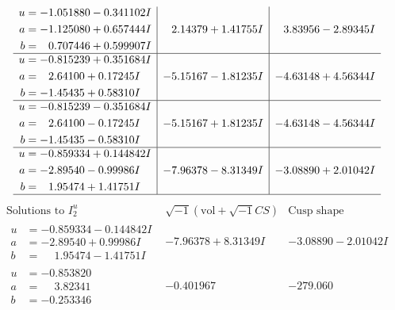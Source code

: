 \documentclass[1p]{elsarticle_modified}
\theoremstyle{definition}
\newcommand{\I}{\sqrt{-1}}
\begin{document}
$$\begin{array}{c|c|c}
\begin{aligned}
u &= -1.051880 - 0.341102 I \\
a &= -1.125080 + 0.657444 I \\
b &= \phantom{-}0.707446 + 0.599907 I\end{aligned}
 & \phantom{-}2.14379 + 1.41755 I & \phantom{-}3.83956 - 2.89345 I \\ \hline\begin{aligned}
u &= -0.815239 + 0.351684 I \\
a &= \phantom{-}2.64100 + 0.17245 I \\
b &= -1.45435 + 0.58310 I\end{aligned}
 & -5.15167 - 1.81235 I & -4.63148 + 4.56344 I \\ \hline\begin{aligned}
u &= -0.815239 - 0.351684 I \\
a &= \phantom{-}2.64100 - 0.17245 I \\
b &= -1.45435 - 0.58310 I\end{aligned}
 & -5.15167 + 1.81235 I & -4.63148 - 4.56344 I \\ \hline\begin{aligned}
u &= -0.859334 + 0.144842 I \\
a &= -2.89540 - 0.99986 I \\
b &= \phantom{-}1.95474 + 1.41751 I\end{aligned}
 & -7.96378 - 8.31349 I & -3.08890 + 2.01042 I\\
 \hline 
 \end{array}$$\newpage$$\begin{array}{c|c|c}  
\text{Solutions to }I^u_{2}& \I (\text{vol} + \sqrt{-1}CS) & \text{Cusp shape}\\
 \hline 
\begin{aligned}
u &= -0.859334 - 0.144842 I \\
a &= -2.89540 + 0.99986 I \\
b &= \phantom{-}1.95474 - 1.41751 I\end{aligned}
 & -7.96378 + 8.31349 I & -3.08890 - 2.01042 I \\ \hline\begin{aligned}
u &= -0.853820\phantom{ +0.000000I} \\
a &= \phantom{-}3.82341\phantom{ +0.000000I} \\
b &= -0.253346\phantom{ +0.000000I}\end{aligned}
 & -0.401967\phantom{ +0.000000I} & -279.060\phantom{ +0.000000I} \\ \hline\begin{aligned}

\end{aligned}
\end{array}$$
\end{document}
